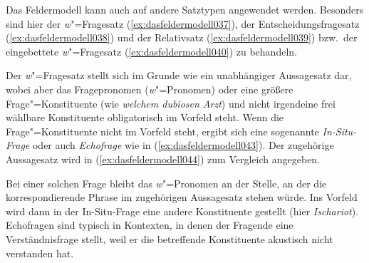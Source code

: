 
Das Feldermodell kann auch auf andere Satztypen angewendet werden.
Besonders sind hier der \textit{w}"=Fragesatz (\ref{ex:dasfeldermodell037}), der Entscheidungsfragesatz (\ref{ex:dasfeldermodell038}) und der Relativsatz (\ref{ex:dasfeldermodell039}) bzw.\ der eingebettete \textit{w}"=Fragesatz (\ref{ex:dasfeldermodell040}) zu behandeln.

\begin{exe}
  \ex\label{ex:dasfeldermodell036}
  \begin{xlist}
  \end{xlist}
\end{exe}

\label{abs:dasfeldermodell041} Der \textit{w}"=Fragesatz stellt sich im Grunde wie ein unabhängiger Aussagesatz dar, wobei aber das Fragepronomen (\textit{w}"=Pronomen) oder eine größere Frage"=Konstituente (wie \textit{welchem dubiosen Arzt}) und nicht irgendeine frei wählbare Konstituente obligatorisch im Vorfeld steht.
Wenn die Frage"=Konstituente nicht im Vorfeld steht, ergibt sich eine sogenannte \textit{In-Situ-Frage} oder auch \textit{Echofrage} wie in (\ref{ex:dasfeldermodell043}).
Der zugehörige Aussagesatz wird in (\ref{ex:dasfeldermodell044}) zum Vergleich angegeben.

\begin{exe}
  \ex\label{ex:dasfeldermodell042}
  \begin{xlist}
  \end{xlist}
\end{exe}

Bei einer solchen Frage bleibt das \textit{w}"=Pronomen an der Stelle, an der die korrespondierende Phrase im zugehörigen Aussagesatz stehen würde.
Ins Vorfeld wird dann in der In-Situ-Frage eine andere Konstituente gestellt (hier \zB \textit{Ischariot}).
Echofragen sind typisch in Kontexten, in denen der Fragende eine Verständnisfrage stellt, weil er die betreffende Konstituente akustisch nicht verstanden hat.


